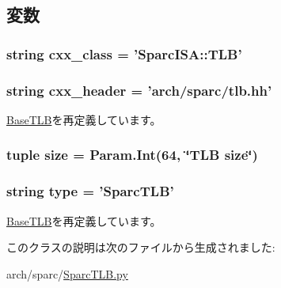 \subsection{変数}
\hypertarget{classSparcTLB_1_1SparcTLB_a58cd55cd4023648e138237cfc0822ae3}{
\subsubsection[{cxx\_\-class}]{\setlength{\rightskip}{0pt plus 5cm}string {\bf cxx\_\-class} = '{\bf SparcISA::TLB}'}}
\label{classSparcTLB_1_1SparcTLB_a58cd55cd4023648e138237cfc0822ae3}
\hypertarget{classSparcTLB_1_1SparcTLB_a17da7064bc5c518791f0c891eff05fda}{
\subsubsection[{cxx\_\-header}]{\setlength{\rightskip}{0pt plus 5cm}string {\bf cxx\_\-header} = 'arch/sparc/tlb.hh'}}
\label{classSparcTLB_1_1SparcTLB_a17da7064bc5c518791f0c891eff05fda}


\hyperlink{classBaseTLB_1_1BaseTLB_a17da7064bc5c518791f0c891eff05fda}{BaseTLB}を再定義しています。\hypertarget{classSparcTLB_1_1SparcTLB_a377e5da8df1f89c5468c8b8cd07eac89}{
\subsubsection[{size}]{\setlength{\rightskip}{0pt plus 5cm}tuple {\bf size} = Param.Int(64, \char`\"{}TLB {\bf size}\char`\"{})}}
\label{classSparcTLB_1_1SparcTLB_a377e5da8df1f89c5468c8b8cd07eac89}
\hypertarget{classSparcTLB_1_1SparcTLB_acce15679d830831b0bbe8ebc2a60b2ca}{
\subsubsection[{type}]{\setlength{\rightskip}{0pt plus 5cm}string {\bf type} = '{\bf SparcTLB}'}}
\label{classSparcTLB_1_1SparcTLB_acce15679d830831b0bbe8ebc2a60b2ca}


\hyperlink{classBaseTLB_1_1BaseTLB_acce15679d830831b0bbe8ebc2a60b2ca}{BaseTLB}を再定義しています。

このクラスの説明は次のファイルから生成されました:\begin{DoxyCompactItemize}
\item 
arch/sparc/\hyperlink{SparcTLB_8py}{SparcTLB.py}\end{DoxyCompactItemize}
